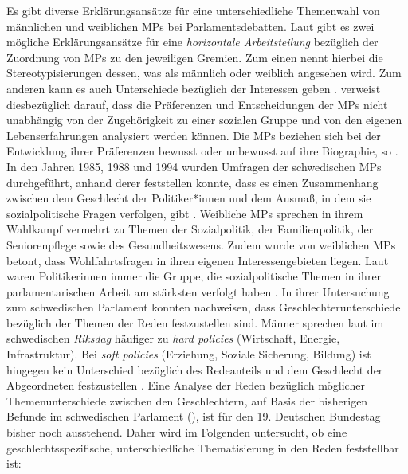 \documentclass[12pt, 
    twoside=false, 
    bibliography=totoc, 
    numbers=endperiod, 
    headings=normal, 
    toc=chapterentrydotfill
    ]{scrbook}
\begin{document}
Es gibt diverse Erklärungsansätze für eine unterschiedliche Themenwahl von männlichen und weiblichen MPs bei Parlamentsdebatten. Laut \textcite{wangnerud_1996}  gibt es zwei mögliche Erklärungsansätze für eine \emph{horizontale Arbeitsteilung} bezüglich der Zuordnung von MPs zu den jeweiligen Gremien. Zum einen nennt \citeauthor{wangnerud_1996} hierbei die Stereotypisierungen dessen, was als männlich oder weiblich angesehen wird. Zum anderen kann es auch Unterschiede bezüglich der Interessen geben \parencite{wangnerud_1996}.   \citeauthor{back_2014} verweist diesbezüglich darauf, dass die Präferenzen und Entscheidungen der MPs nicht unabhängig von der Zugehörigkeit zu einer sozialen Gruppe und von den eigenen Lebenserfahrungen analysiert werden können. Die MPs beziehen sich bei der Entwicklung ihrer Präferenzen bewusst oder unbewusst auf ihre Biographie, so \textcite[507]{back_2014}. 
In den Jahren 1985, 1988 und 1994 wurden Umfragen der schwedischen MPs durchgeführt, anhand derer \textcite[81]{wangnerud_2000} feststellen konnte, dass es einen Zusammenhang zwischen dem Geschlecht der Politiker*innen und dem Ausmaß, in dem sie sozialpolitische Fragen verfolgen, gibt \parencites[506]{back_2014}[82]{wangnerud_2000}. Weibliche MPs sprechen in ihrem Wahlkampf vermehrt zu Themen der Sozialpolitik, der Familienpolitik, der Seniorenpflege sowie des Gesundheitswesens. Zudem wurde von weiblichen MPs betont, dass Wohlfahrtsfragen in ihren eigenen Interessengebieten liegen. Laut \textcite[82]{wangnerud_2000} waren Politikerinnen immer die Gruppe, die sozialpolitische Themen in ihrer parlamentarischen Arbeit am stärksten verfolgt haben \parencites[vgl.][507]{back_2014}.
In ihrer Untersuchung zum schwedischen Parlament konnten \textcite{back_2014} nachweisen, dass Geschlechterunterschiede bezüglich der Themen der Reden festzustellen sind. Männer sprechen laut \textcite{back_2014} im schwedischen \emph{Riksdag} häufiger zu \emph{hard policies} (Wirtschaft, Energie, Infrastruktur). Bei \emph{soft policies} (Erziehung, Soziale Sicherung, Bildung) ist hingegen kein Unterschied bezüglich des Redeanteils und dem Geschlecht der Abgeordneten festzustellen \parencite[514f.]{back_2014}. Eine Analyse der Reden bezüglich möglicher Themenunterschiede zwischen den Geschlechtern, auf Basis der bisherigen Befunde im schwedischen Parlament (\parencites{wangnerud_2000}{wangnerud_2009}{back_2014}), ist für den 19. Deutschen Bundestag bisher noch ausstehend. Daher wird im Folgenden untersucht, ob eine geschlechtsspezifische, unterschiedliche Thematisierung in den Reden feststellbar ist: 
\end{document}
